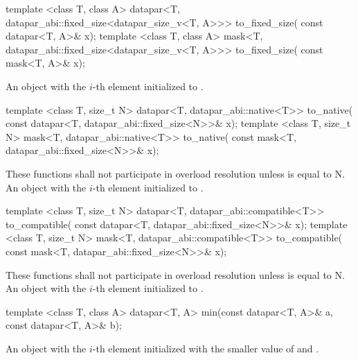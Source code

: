 \begin{itemdecl}
template <class T, class A>
datapar<T, datapar_abi::fixed_size<datapar_size_v<T, A>>> to_fixed_size(
    const datapar<T, A>& x);
template <class T, class A>
mask<T, datapar_abi::fixed_size<datapar_size_v<T, A>>> to_fixed_size(
    const mask<T, A>& x);
\end{itemdecl}
\begin{itemdescr}
  \pnum\returns An object with the $i$-th element initialized to .
\end{itemdescr}

\begin{itemdecl}
template <class T, size_t N>
datapar<T, datapar_abi::native<T>> to_native(
    const datapar<T, datapar_abi::fixed_size<N>>& x);
template <class T, size_t N>
mask<T, datapar_abi::native<T>> to_native(
    const mask<T, datapar_abi::fixed_size<N>>& x);
\end{itemdecl}
\begin{itemdescr}
  \pnum\remarks These functions shall not participate in overload resolution unless  is equal to \code N.
  \pnum\returns An object with the $i$-th element initialized to .
\end{itemdescr}

\begin{itemdecl}
template <class T, size_t N>
datapar<T, datapar_abi::compatible<T>> to_compatible(
    const datapar<T, datapar_abi::fixed_size<N>>& x);
template <class T, size_t N>
mask<T, datapar_abi::compatible<T>> to_compatible(
    const mask<T, datapar_abi::fixed_size<N>>& x);
\end{itemdecl}
\begin{itemdescr}
  \pnum\remarks These functions shall not participate in overload resolution unless  is equal to \code N.
  \pnum\returns An object with the $i$-th element initialized to .
\end{itemdescr}

\begin{itemdecl}
template <class T, class A>
datapar<T, A> min(const datapar<T, A>& a, const datapar<T, A>& b);
\end{itemdecl}
\begin{itemdescr}
  \pnum\returns An object with the $i$-th element initialized with the smaller value of  and  \foralli.
\end{itemdescr}

